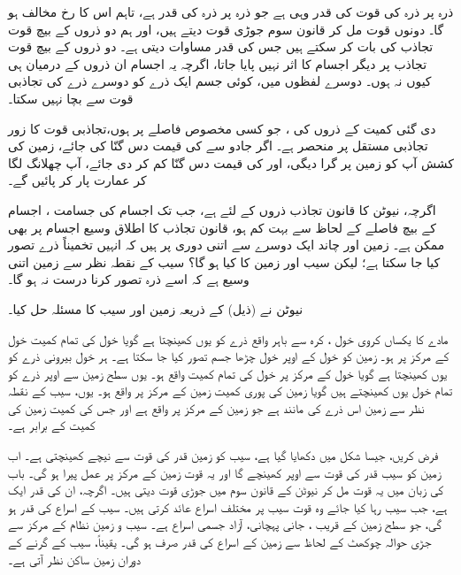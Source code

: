 ذرہ  پر ذرہ  کی قوت کی قدر  وہی ہے  جو ذرہ  پر ذرہ  کی قدر  ہے، تاہم اس کا رخ  مخالف ہو گا۔ دونوں قوت مل کر  قانون سوم  جوڑی    قوت دیتے ہیں، اور ہم  دو ذروں کے بیچ قوت تجاذب  کی بات  کر سکتے ہیں جس کی قدر مساوات  دیتی ہے۔ دو ذروں کے بیچ قوت تجاذب  پر دیگر اجسام  کا اثر نہیں پایا جاتا، اگرچہ یہ اجسام ان ذروں کے  درمیان ہی  کیوں نہ ہوں۔ دوسرے لفظوں میں، کوئی  جسم ایک ذرے کو دوسرے ذرے کی تجاذبی قوت سے   بچا نہیں سکتا۔

دی گئی کمیت کے ذروں کی ، جو کسی مخصوص فاصلے پر ہوں،تجاذبی قوت کا زور  تجاذبی مستقل  پر منحصر ہے۔ اگر جادو  سے  کی قیمت دس گنّا کی جائے، زمین کی کشش آپ کو زمین پر گرا دیگی، اور  کی قیمت دس گنّا کم کر دی جائے، آپ چھلانگ  لگا کر  عمارت  پار کر پائیں گے۔

\quad
اگرچہ، نیوٹن کا قانون تجاذب  ذروں کے لئے ہے،  جب تک اجسام کی جسامت ، اجسام کے بیچ فاصلے کے لحاظ سے بہت کم ہو،  قانون تجاذب  کا اطلاق وسیع اجسام  پر بھی  ممکن ہے۔ زمین اور چاند ایک دوسرے سے  اتنی دوری پر ہیں کہ انہیں تخمیناً ذرے تصور کیا جا سکتا ہے؛ لیکن سیب اور زمین  کا کیا ہو گا؟ سیب کے نقطہ نظر سے زمین اتنی وسیع ہے کہ اسے  ذرہ تصور  کرنا درست نہ ہو گا۔

نیوٹن نے (ذیل)    کے ذریعہ زمین اور سیب کا مسئلہ حل کیا۔

مادے کا یکساں کروی خول ، کرہ سے باہر واقع  ذرے کو یوں کھینچتا ہے گویا  خول  کی تمام کمیت خول کے مرکز پر ہو۔
 زمین کو خول کے اوپر خول چڑھا  جسم تصور کیا جا سکتا ہے۔ ہر خول بیرونی ذرے کو یوں کھینچتا ہے گویا خول کے مرکز پر خول کی تمام کمیت واقع ہو۔ یوں  سطح زمین   سے   اوپر ذرے کو تمام خول یوں کھینچتے ہیں گویا زمین کی پوری کمیت زمین کے مرکز پر واقع ہو۔ یوں، سیب کے نقطہ نظر سے زمین اس  ذرے کی مانند ہے جو زمین کے مرکز پر واقع ہے اور جس کی کمیت زمین کی کمیت کے برابر ہے۔

\quad
فرض کریں، جیسا شکل  میں دکھایا گیا ہے، سیب کو زمین  قدر کی قوت سے نیچے کھینچتی ہے۔ اب  زمین کو سیب   قدر کی  قوت سے اوپر کھینچے گا اور یہ قوت زمین کے مرکز پر عمل پیرا ہو گی۔ باب  کی زبان میں  یہ قوت مل کر نیوٹن کے قانون سوم  میں جوڑی قوت دیتی ہیں۔ اگرچہ، ان کی قدر ایک ہے، جب سیب رہا کیا جائے وہ قوت سیب پر مختلف اسراع عائد کرتی ہیں۔ سیب کے اسراع کی قدر  ہو گی، جو سطح زمین کے قریب  ، جانی پہچانی، آزاد جسمی اسراع ہے۔ سیب و زمین نظام  کے مرکز سے جڑی  حوالہ چوکھٹ  کے لحاظ سے زمین کے اسراع کی قدر صرف  ہو گی۔ یقیناً،  سیب کے گرنے کے دوران زمین ساکن نظر آتی ہے۔

